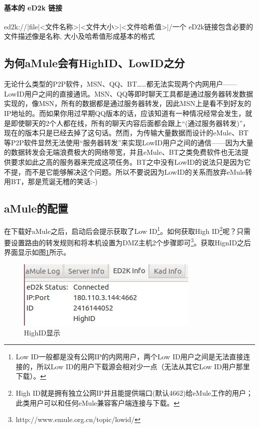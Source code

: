 \documentclass[paper=a4,fontsize=11pt]{article}
\begin{document}
	\paragraph{基本的 eD2k 链接}
	ed2k://|file|<文件名称>|<文件大小>|<文件哈希值>|/一个 eD2k链接包含必要的文件描述像是名称, 大小及哈希值形成基本的格式
	
	\subsection{为何aMule会有HighID、LowID之分}
	
	无论什么类型的P2P软件，MSN、QQ、BT……都无法实现两个内网用户——LowID用户之间的直接通讯。MSN、QQ等即时聊天工具都是通过服务器转发数据实现的，像MSN，所有的数据都是通过服务器转发，因此MSN上是看不到好友的IP地址的。而如果你用过早期QQ版本的话，应该知道有一种情况经常会发生，就是即使聊天的2个人都在线，所有的聊天内容后面都会跟上“(通过服务器转发)”，现在的版本只是已经去掉了这句话。然而，为传输大量数据而设计的eMule、BT等P2P软件显然无法使用“服务器转发”来实现LowID用户之间的通信——因为大量的数据转发会无端浪费极大的网络带宽，并且eMule、BT之类免费软件也无法提供要求如此之高的服务器来完成这项任务。BT之中没有LowID的说法只是因为它不提，而不是它能够解决这个问题。所以不要说因为LowID的关系而放弃eMule转用BT，那是荒诞无稽的笑话:-)
		
	\subsection{aMule的配置}
	在下载好aMule之后，启动后会提示获取了Low ID\footnote{Low ID一般都是没有公网IP的内网用户，两个Low ID用户之间是无法直接连接的，所以Low ID的用户下载源会相对少一点（无法从其它Low ID用户那里下载）。}。如何获取High ID\footnote{High ID就是拥有独立公网IP并且能提供端口(默认4662)给eMule工作的用户；此类用户可以和任何eMule兼容客户端连接与下载。}呢？只需要设置路由的转发规则和将本机设置为DMZ主机2个步骤即可\footnote{http://www.emule.org.cn/topic/lowid/}。获取HignID之后界面显示如图\ref{GetHighID}所示。
	
	\begin{figure}[htbp]
		\centering
		\includegraphics[scale=0.8]{GetHighID.jpeg}
		\caption{HighID显示}
		\label{GetHighID}
	\end{figure}
	
\end{document}
